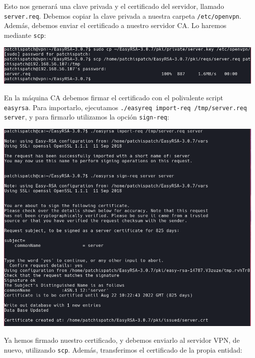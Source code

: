 \documentclass[11pt,a4paper]{article}
\begin{document}
\medskip

Esto nos generará una clave privada y el certificado del servidor, llamado \texttt{server.req}. Debemos copiar la clave privada a nuestra carpeta \texttt{/etc/openvpn}. Además, debemos enviar el certificado a nuestro servidor CA. Lo haremos mediante \texttt{scp}:

\medskip

\begin{center}
\includegraphics[scale=0.4]{scp-server-req.png}
\end{center}

\medskip

En la máquina CA debemos firmar el certificado con el polivalente script \texttt{easyrsa}. Para importarlo, ejecutamos \texttt{./easyreq import-req /tmp/server.req server}, y para firmarlo utilizamos la opción \texttt{sign-req}:

\medskip

\begin{center}
\includegraphics[scale=0.4]{sign-req.png}
\end{center}

\medskip

Ya hemos firmado nuestro certificado, y debemos enviarlo al servidor VPN, de nuevo, utilizando \texttt{scp}. Además, transferimos el certificado de la propia entidad:
\end{document}
